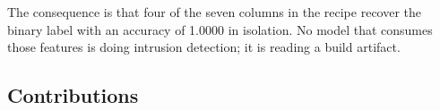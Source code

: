 \begin{wfigure}
\begin{fittable}
\end{fittable}
\caption{How file provenance becomes the label. The two captures were parsed in
separate passes that serialise an absent field differently, and dummy encoding
turns the two spellings into indicator columns. Since the files partition the
classes, either column reproduces the label. No step involves network
behaviour.}
\label{fig:mechanism}
\end{wfigure}

The consequence is that four of the seven columns in the recipe recover the
binary label with an accuracy of 1.0000 in isolation. No model that consumes
those features is doing intrusion detection; it is reading a build artifact.

\subsection{Contributions}

